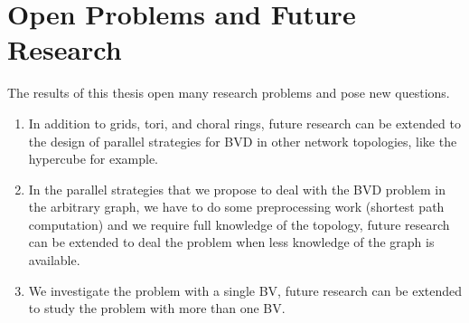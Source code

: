 \section{Open Problems and Future Research}
The results of this thesis open many research problems and pose new questions.
\begin{enumerate}
\item In addition to grids, tori, and choral rings, future research can be extended to the design of parallel strategies for BVD  in other   network topologies, like the hypercube for example.
\item In the parallel strategies that we propose to deal with the BVD problem in the arbitrary graph, we have to do some preprocessing work (shortest path computation)  and we require full knowledge of the topology,  future research can be extended to deal the problem when less knowledge of the graph is available.
\item We   investigate the problem with   a single  BV,   future research can be extended to study the problem with more than one BV.
\end{enumerate}


















